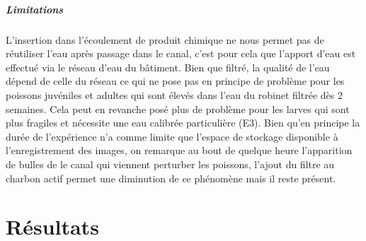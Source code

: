   \paragraph{Limitations}
  L'insertion dans l'écoulement de produit chimique ne nous permet pas de réutiliser l'eau après passage dans le canal, c'est pour cela que l'apport d'eau est effectué via le réseau d'eau du bâtiment. Bien que filtré, la qualité de l'eau dépend de celle du réseau ce qui ne pose pas en principe de problème pour les poissons juvéniles et adultes qui sont élevés dans l'eau du robinet filtrée dès 2 semaines. Cela peut en revanche posé plus de problème pour les larves qui sont plus fragiles et nécessite une eau calibrée particulière (E3).
  Bien qu'en principe la durée de l'expérience n'a comme limite que l'espace de stockage disponible à l'enregistrement des images, on remarque au bout de quelque heure l'apparition de bulles de le canal qui viennent perturber les poissons, l'ajout du filtre au charbon actif permet une diminution de ce phénomène mais il reste présent.


\chapter{Résultats}

